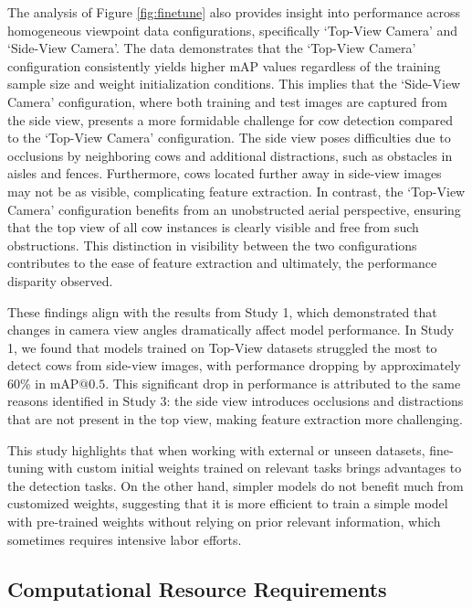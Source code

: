 The analysis of Figure \ref{fig:finetune} also provides insight into performance across homogeneous viewpoint data configurations, specifically `Top-View Camera' and `Side-View Camera'. The data demonstrates that the `Top-View Camera' configuration consistently yields higher mAP values regardless of the training sample size and weight initialization conditions. This implies that the `Side-View Camera' configuration, where both training and test images are captured from the side view, presents a more formidable challenge for cow detection compared to the `Top-View Camera' configuration. The side view poses difficulties due to occlusions by neighboring cows and additional distractions, such as obstacles in aisles and fences. Furthermore, cows located further away in side-view images may not be as visible, complicating feature extraction. In contrast, the `Top-View Camera' configuration benefits from an unobstructed aerial perspective, ensuring that the top view of all cow instances is clearly visible and free from such obstructions. This distinction in visibility between the two configurations contributes to the ease of feature extraction and ultimately, the performance disparity observed.

These findings align with the results from Study 1, which demonstrated that changes in camera view angles dramatically affect model performance. In Study 1, we found that models trained on Top-View datasets struggled the most to detect cows from side-view images, with performance dropping by approximately 60\% in $\text{mAP@{0.5}}$. This significant drop in performance is attributed to the same reasons identified in Study 3: the side view introduces occlusions and distractions that are not present in the top view, making feature extraction more challenging. 

This study highlights that when working with external or unseen datasets, fine-tuning with custom initial weights trained on relevant tasks brings advantages to the detection tasks. On the other hand, simpler models do not benefit much from customized weights, suggesting that it is more efficient to train a simple model with pre-trained weights without relying on prior relevant information, which sometimes requires intensive labor efforts.


\subsection*{Computational Resource Requirements}

